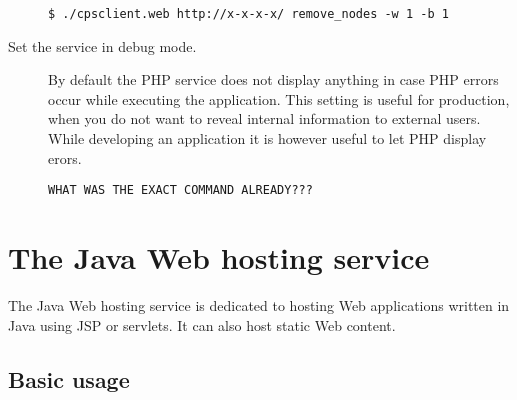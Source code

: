 \documentclass[10pt]{article}
\begin{document}
\begin{description}
\begin{verbatim}
$ ./cpsclient.web http://x-x-x-x/ remove_nodes -w 1 -b 1
\end{verbatim}

\item[Set the service in debug mode.] By default the PHP service does
  not display anything in case PHP errors occur while executing the
  application. This setting is useful for production, when you do not
  want to reveal internal information to external users. While
  developing an application it is however useful to let PHP display
  erors.
\begin{verbatim}
WHAT WAS THE EXACT COMMAND ALREADY???
\end{verbatim}
\end{description}


\section{The Java Web hosting service}

The Java Web hosting service is dedicated to hosting Web applications
written in Java using JSP or servlets. It can also host static Web
content.

\subsection{Basic usage}
\end{document}
